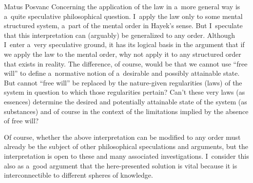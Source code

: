 \begin{artengenv}{Matus Posvanc}
Concerning the application of the law in a~more general way is a~quite speculative philosophical question. I~apply the law only to some mental structured system, a~part of the mental order in Hayek's sense. But I~speculate that this interpretation can (arguably) be generalized to any order. Although I~enter a~very speculative ground, it has its logical basis in the argument that if we apply the law to the mental order, why not apply it to any structured order that exists in reality. The difference, of course, would be that we cannot use ``free will'' to define a~normative notion of a~desirable and possibly attainable state. But cannot ``free will'' be replaced by the nature-given regularities (laws) of the system in question to which those regularities pertain? Can't these very laws (as essences) determine the desired and potentially attainable state of the system (as substances) and of course in the context of the limitations implied by the absence of free will?



Of course, whether the above interpretation can be modified to any order must already be the subject of other philosophical speculations and arguments, but the interpretation is open to these and many associated investigations. I~consider this also as a~good argument that the here-presented solution is vital because it is interconnectible to different spheres of knowledge.
\enlargethispage{2.5\baselineskip}



\renewcommand{\figurename}{Figure}
\end{artengenv}

